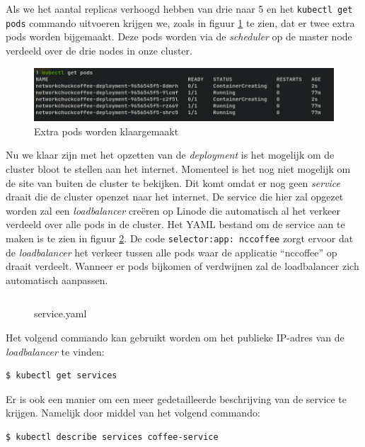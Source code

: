 Als we het aantal replicas verhoogd hebben van drie naar 5 en het \verb|kubectl get pods| commando uitvoeren krijgen we, zoals in figuur \ref{fig:kubectlGetPodsEditDeploy1} te zien, dat er twee extra pods worden bijgemaakt. Deze pods worden via de \textit{scheduler} op de master node verdeeld over de drie nodes in onze cluster.
\begin{figure}[h]
	\centering
	\includegraphics[width=\linewidth]{img/kubectlGetPodsEditDeploy1.png}
	\caption{Extra pods worden klaargemaakt}
	\label{fig:kubectlGetPodsEditDeploy1}
\end{figure}

Nu we klaar zijn met het opzetten van de \textit{deployment} is het mogelijk om de cluster bloot te stellen aan het internet. Momenteel is het nog niet mogelijk om de site van buiten de cluster te bekijken. Dit komt omdat er nog geen \textit{service} draait die de cluster openzet naar het internet. De service die hier zal opgezet worden zal een \textit{loadbalancer} creëren op Linode die automatisch al het verkeer verdeeld over alle pods in de cluster. Het YAML bestand om de service aan te maken is te zien in figuur \ref{service1}. De code \verb|selector:app: nccoffee| zorgt ervoor dat de \textit{loadbalancer} het verkeer tussen alle pods waar de applicatie ``nccoffee'' op draait verdeelt. Wanneer er pods bijkomen of verdwijnen zal de loadbalancer zich automatisch aanpassen. 

\begin{figure}[h] 
	\inputminted[fontsize=\footnotesize,linenos]{yaml}{files/testservice.yaml}
	\caption{service.yaml}
	\label{service1}
\end{figure}

Het volgend commando kan gebruikt worden om het publieke IP-adres van de \textit{loadbalancer} te vinden:
\begin{verbatim} 
$ kubectl get services
\end{verbatim}

Er is ook een manier om een meer gedetailleerde beschrijving van de service te krijgen. Namelijk door middel van het volgend commando:
\begin{verbatim} 
$ kubectl describe services coffee-service 
\end{verbatim}

